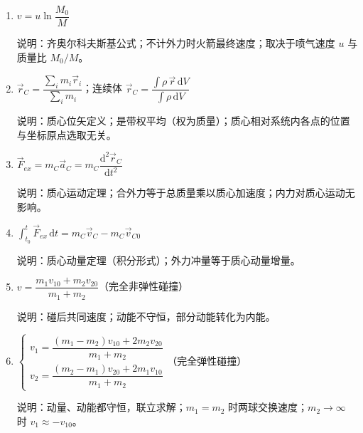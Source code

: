 \documentclass[12pt,a4paper]{ctexart}
\begin{document}
\begin{enumerate}[leftmargin=3em,label=\textbf{公式\arabic*}：,ref=公式\arabic*]
    说明：变质量系统的统一公式（密歇尔斯基方程）；$v_r$ 为 $\mathrm{d}m$ 相对 $m$ 的速度；火箭问题 $v_r \ne 0$，漏沙问题 $v_r = 0$。

    \item $v = u\ln\dfrac{M_0}{M}$

    说明：齐奥尔科夫斯基公式；不计外力时火箭最终速度；取决于喷气速度 $u$ 与质量比 $M_0/M$。

    \item $\vec{r}_C = \dfrac{\sum_i m_i \vec{r}_i}{\sum_i m_i}$；连续体 $\vec{r}_C = \dfrac{\int \rho\,\vec{r}\,\mathrm{d}V}{\int \rho\,\mathrm{d}V}$

    说明：质心位矢定义；是带权平均（权为质量）；质心相对系统内各点的位置与坐标原点选取无关。

    \item $\vec{F}_{ex} = m_C\vec{a}_C = m_C\dfrac{\mathrm{d}^2\vec{r}_C}{\mathrm{d}t^2}$

    说明：质心运动定理；合外力等于总质量乘以质心加速度；内力对质心运动无影响。

    \item $\displaystyle\int_{t_0}^t \vec{F}_{ex}\,\mathrm{d}t = m_C\vec{v}_C - m_C\vec{v}_{C0}$

    说明：质心动量定理（积分形式）；外力冲量等于质心动量增量。

    \item $v = \dfrac{m_1 v_{10} + m_2 v_{20}}{m_1 + m_2}$（完全非弹性碰撞）

    说明：碰后共同速度；动能不守恒，部分动能转化为内能。

    \item $\begin{cases} v_1 = \dfrac{(m_1 - m_2)v_{10} + 2m_2 v_{20}}{m_1 + m_2} \\[4pt] v_2 = \dfrac{(m_2 - m_1)v_{20} + 2m_1 v_{10}}{m_1 + m_2} \end{cases}$（完全弹性碰撞）

    说明：动量、动能都守恒，联立求解；$m_1 = m_2$ 时两球交换速度；$m_2 \to \infty$ 时 $v_1 \approx -v_{10}$。

\end{enumerate}
\end{document}
